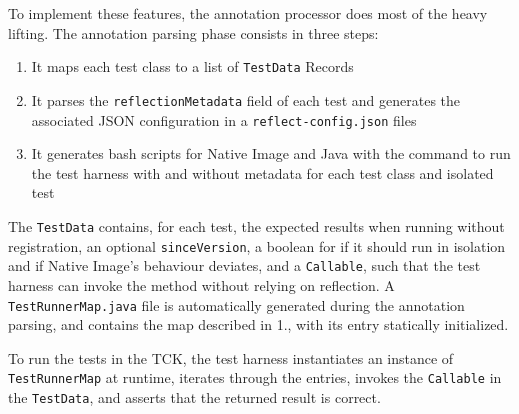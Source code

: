 To implement these features, the annotation processor does most of the heavy lifting. The annotation parsing phase consists in three steps:
\begin{enumerate}
    \item It maps each test class to a list of \verb|TestData| Records 
    \item It parses the \verb|reflectionMetadata| field of each test and generates the associated JSON configuration in a \verb|reflect-config.json| files
    \item It generates bash scripts for Native Image and Java with the command to run the test harness with and without metadata for each test class and isolated test
\end{enumerate}
The \verb|TestData| contains, for each test, the expected results when running without registration, an optional \verb|sinceVersion|, a boolean for if it should run in isolation and if Native Image's behaviour deviates, and a \verb|Callable|, such that the test harness can invoke the method without relying on reflection.  
A \verb|TestRunnerMap.java| file is automatically generated during the annotation parsing, and contains the map described in 1., with its entry statically initialized. 

To run the tests in the TCK, the test harness instantiates an instance of \verb|TestRunnerMap| at runtime, iterates through the entries, invokes the \verb|Callable| in the \verb|TestData|, and asserts that the returned result is correct.


